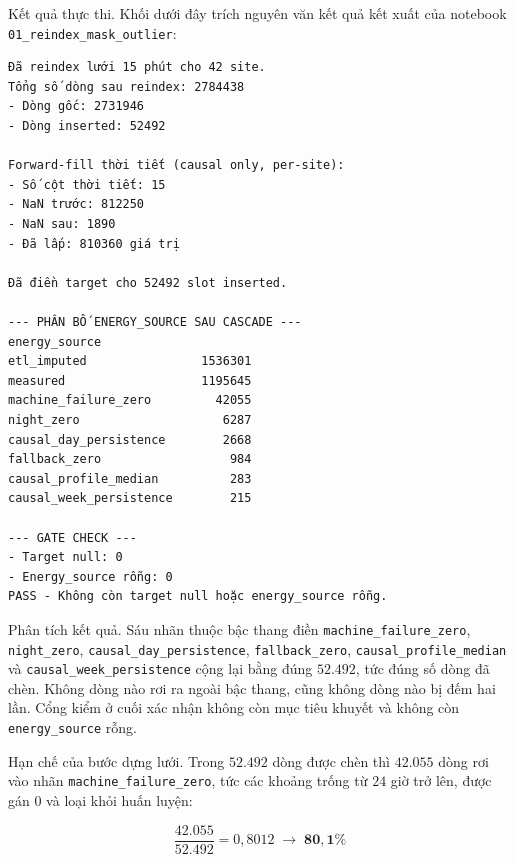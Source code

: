 \documentclass[12pt, a4paper]{report}
\begin{document}
Kết quả thực thi. Khối dưới đây trích nguyên văn kết quả kết xuất của notebook
\texttt{01\_reindex\_mask\_outlier}:

\begingroup
\par{}\vspace{8pt}
\small\renewcommand{\baselinestretch}{1.0}\selectfont
\begin{verbatim}
Đã reindex lưới 15 phút cho 42 site.
Tổng số dòng sau reindex: 2784438
- Dòng gốc: 2731946
- Dòng inserted: 52492

Forward-fill thời tiết (causal only, per-site):
- Số cột thời tiết: 15
- NaN trước: 812250
- NaN sau: 1890
- Đã lấp: 810360 giá trị

Đã điền target cho 52492 slot inserted.

--- PHÂN BỐ ENERGY_SOURCE SAU CASCADE ---
energy_source
etl_imputed                1536301
measured                   1195645
machine_failure_zero         42055
night_zero                    6287
causal_day_persistence        2668
fallback_zero                  984
causal_profile_median          283
causal_week_persistence        215

--- GATE CHECK ---
- Target null: 0
- Energy_source rỗng: 0
PASS - Không còn target null hoặc energy_source rỗng.
\end{verbatim}
\par\vspace{8pt}
\endgroup

Phân tích kết quả. Sáu nhãn thuộc bậc thang điền \texttt{machine\_failure\_zero},
\texttt{night\_zero}, \texttt{causal\_day\_persistence}, \texttt{fallback\_zero},
\texttt{causal\_profile\_median} và \texttt{causal\_week\_persistence} cộng lại bằng đúng
$52.492$, tức đúng số dòng đã chèn. Không dòng nào rơi ra ngoài bậc thang, cũng không dòng
nào bị đếm hai lần. Cổng kiểm ở cuối xác nhận không còn mục tiêu khuyết và không còn
\texttt{energy\_source} rỗng.

Hạn chế của bước dựng lưới. Trong $52.492$ dòng được chèn thì $42.055$ dòng rơi vào
nhãn \texttt{machine\_failure\_zero}, tức các khoảng trống từ $24$ giờ trở lên, được gán $0$ và
loại khỏi huấn luyện:

\begin{equation}
\frac{42.055}{52.492} = 0{,}8012 \;\longrightarrow\; \mathbf{80{,}1\%}
\end{equation}
\end{document}
